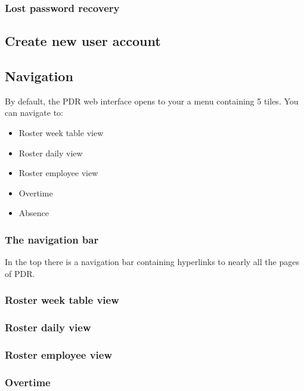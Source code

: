 \documentclass[12pt,a4paper,titlepage]{book}
\begin{document}
\subsubsection{Lost password recovery}


\subsection{Create new user account}

\subsection{Navigation}
By default, the PDR web interface opens to your a menu containing 5 tiles.
You can navigate to:
\begin{itemize}
\item Roster week table view
\item Roster daily view
\item Roster employee view
\item Overtime 
\item Absence
\end{itemize}
\subsubsection{The navigation bar}
In the top there is a navigation bar containing hyperlinks to nearly all the pages of PDR.

\subsubsection{Roster week table view}
\subsubsection{Roster daily view}
\subsubsection{Roster employee view}
\subsubsection{Overtime}
\end{document}
